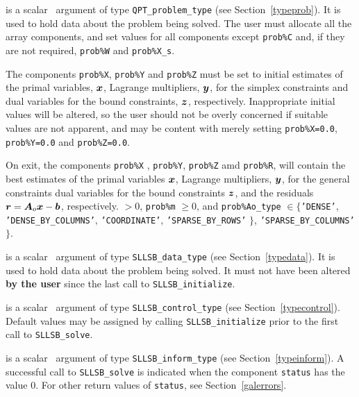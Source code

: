 \documentclass{galahad}
\newcommand{\packagename}{SLLSB}
\begin{document}
\begin{description}
 is a scalar \intentinout\ argument of type
{\tt QPT\_problem\_type}
(see Section~\ref{typeprob}).
It is used to hold data about the problem being solved.
The user must allocate all the array components,
and set values for all components except {\tt prob\%C}
and, if they are not required, {\tt prob\%W} and {\tt prob\%X\_s}.

The components {\tt prob\%X}, {\tt prob\%Y} and {\tt prob\%Z}
must be set to initial estimates of the primal variables, ${\bm{x}}$,
Lagrange multipliers, ${\bm{y}}$, for the simplex constraints
and dual variables for the bound constraints, ${\bm{z}}$, respectively.
Inappropriate initial values will be altered, so the user should
not be overly concerned if suitable values are not apparent, and may be
content with merely setting {\tt prob\%X=0.0}, {\tt prob\%Y=0.0}
and {\tt prob\%Z=0.0}.

On exit, the components {\tt prob\%X} , {\tt prob\%Y},
{\tt prob\%Z} amd {\tt prob\%R}, 
will contain the best estimates of the primal variables ${\bm{x}}$,
Lagrange multipliers, ${\bm{y}}$, for the general constraints
dual variables for the bound constraints ${\bm{z}}$, 
and the residuals ${\bm{r}} = {\bm{A}}_o {\bm{x}} - {\bm{b}}$, respectively.
 $> 0$, {\tt prob\%m} $\geq 0$, and
 {\tt prob\%Ao\_type} $\in \{${\tt 'DENSE'},
 {\tt 'DENSE\_BY\_COLUMNS'},
 {\tt 'COORDINATE'}, {\tt 'SPARSE\_BY\_\-ROWS'} $\}$,
 {\tt 'SPARSE\_BY\_\-COLUMNS'} $\}$.

 is a scalar \intentinout\ argument of type
{\tt \packagename\_data\_type}
(see Section~\ref{typedata}). It is used to hold data about the problem being
solved. It must not have been altered {\bf by the user} since the last call to
{\tt \packagename\_initialize}.

 is a scalar \intentin\ argument of type
{\tt \packagename\_control\_type}
(see Section~\ref{typecontrol}). Default values may be assigned by calling
{\tt \packagename\_initialize} prior to the first call to
{\tt \packagename\_solve}.

 is a scalar \intentinout\ argument of type
{\tt \packagename\_inform\_type}
(see Section~\ref{typeinform}).
A successful call to
{\tt \packagename\_solve}
is indicated when the  component {\tt status} has the value 0.
For other return values of {\tt status}, see Section~\ref{galerrors}.

\end{description}
\end{document}
